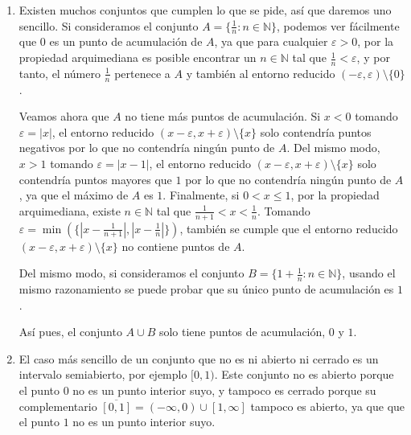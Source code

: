 \documentclass[
  spanish,
  a4paper,
]{scrreport}
\theoremstyle{definition}
\theoremstyle{remark}
\begin{document}
\begin{tcolorbox}[enhanced jigsaw, arc=.35mm, bottomrule=.15mm, bottomtitle=1mm, breakable, colback=white, colbacktitle=quarto-callout-tip-color!10!white, colframe=quarto-callout-tip-color-frame, coltitle=black, left=2mm, leftrule=.75mm, opacityback=0, opacitybacktitle=0.6, rightrule=.15mm, title=\textcolor{quarto-callout-tip-color}{\faLightbulb}\hspace{0.5em}{Solución}, titlerule=0mm, toprule=.15mm, toptitle=1mm]

\begin{enumerate}
\def\labelenumi{\alph{enumi}.}
\item
  Existen muchos conjuntos que cumplen lo que se pide, así que daremos
  uno sencillo. Si consideramos el conjunto
  \(A=\{\frac{1}{n}: n\in\mathbb{N}\}\), podemos ver fácilmente que
  \(0\) es un punto de acumulación de \(A\), ya que para cualquier
  \(\varepsilon>0\), por la propiedad arquimediana es posible encontrar
  un \(n\in\mathbb{N}\) tal que \(\frac{1}{n}<\varepsilon\), y por
  tanto, el número \(\frac{1}{n}\) pertenece a \(A\) y también al
  entorno reducido \((-\varepsilon,\varepsilon)\setminus \{0\}\).

  Veamos ahora que \(A\) no tiene más puntos de acumulación. Si \(x<0\)
  tomando \(\varepsilon = |x|\), el entorno reducido
  \((x-\varepsilon,x+\varepsilon)\setminus \{x\}\) solo contendría
  puntos negativos por lo que no contendría ningún punto de \(A\). Del
  mismo modo, \(x>1\) tomando \(\varepsilon = |x-1|\), el entorno
  reducido \((x-\varepsilon,x+\varepsilon)\setminus \{x\}\) solo
  contendría puntos mayores que \(1\) por lo que no contendría ningún
  punto de \(A\), ya que el máximo de \(A\) es \(1\). Finalmente, si
  \(0<x\leq 1\), por la propiedad arquimediana, existe
  \(n\in\mathbb{N}\) tal que \(\frac{1}{n+1}<x<\frac{1}{n}\). Tomando
  \(\varepsilon= \min(\{|x-\frac{1}{n+1}|, |x-\frac{1}{n}|\})\), también
  se cumple que el entorno reducido
  \((x-\varepsilon,x+\varepsilon)\setminus \{x\}\) no contiene puntos de
  \(A\).

  Del mismo modo, si consideramos el conjunto
  \(B=\{1+\frac{1}{n}:n\in\mathbb{N}\}\), usando el mismo razonamiento
  se puede probar que su único punto de acumulación es \(1\).

  Así pues, el conjunto \(A\cup B\) solo tiene puntos de acumulación,
  \(0\) y \(1\).
\item
  El caso más sencillo de un conjunto que no es ni abierto ni cerrado es
  un intervalo semiabierto, por ejemplo \([0,1)\). Este conjunto no es
  abierto porque el punto \(0\) no es un punto interior suyo, y tampoco
  es cerrado porque su complementario
  \(\overline{[0,1]} = (-\infty,0)\cup [1, \infty]\) tampoco es abierto,
  ya que que el punto \(1\) no es un punto interior suyo.
\end{enumerate}

\end{tcolorbox}
\end{document}
